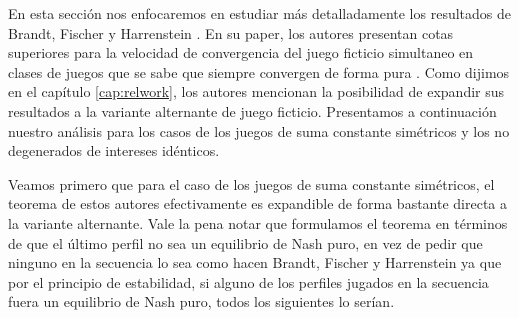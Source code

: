 En esta sección nos enfocaremos en estudiar más detalladamente los resultados de Brandt, Fischer y Harrenstein \cite{brandt:rate:convergence}. En su paper, los autores presentan cotas superiores para la velocidad de convergencia del juego ficticio simultaneo en clases de juegos que se sabe que siempre convergen de forma pura . Como dijimos en el capítulo \ref{cap:relwork}, los autores mencionan la posibilidad de expandir sus resultados a la variante alternante de juego ficticio. Presentamos a continuación nuestro análisis para los casos de los juegos de suma constante simétricos y los no degenerados de intereses idénticos.



Veamos primero que para el caso de los juegos de suma constante simétricos, el teorema de estos autores efectivamente es expandible de forma bastante directa a la variante alternante. Vale la pena notar que formulamos el teorema en términos de que el último perfil no sea un equilibrio de Nash puro, en vez de pedir que ninguno en la secuencia lo sea como hacen Brandt, Fischer y Harrenstein ya que por el principio de estabilidad, si alguno de los perfiles jugados en la secuencia fuera un equilibrio de Nash puro, todos los siguientes lo serían.

